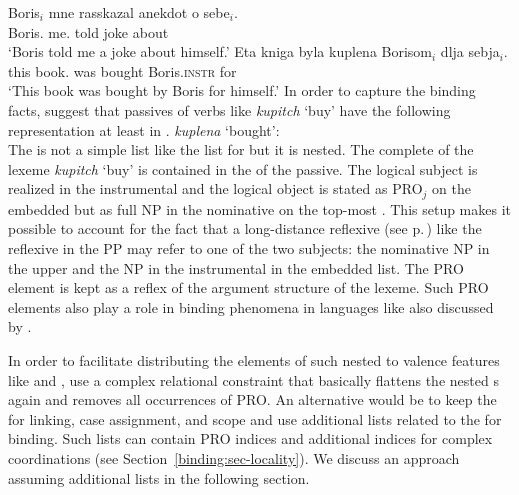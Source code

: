 \documentclass[output=paper
	        ,collection
	        ,collectionchapter
 	        ,biblatex
                ,babelshorthands
                ,newtxmath
                ,draftmode
                ,colorlinks, citecolor=brown
]{langscibook}
\begin{document}
\eal
\label{binding:russian-pass}
\ex  
\gll Boris$_i$    mne      rasskazal anekdot o sebe$_i$.\\
     Boris.\nom{} me.\dat{} told      joke    about \self\\
\glt `Boris told me a joke about himself.'
\ex
\gll Eta kniga byla kuplena Borisom$_{i}$ dlja sebja$_{i}$.  \\
     this book.\nom{} was bought Boris.\textsc{instr} for \self  \\
\glt `This book was bought by Boris for himself.'
\zl
In order to capture the binding facts, \citet{MS98a} suggest that passives of verbs like
\emph{kupitch} `buy' have the following representation at least in .
\ea
\emph{kuplena} `bought':\\
\z
The \argstl is not a simple list like the list for  but it is nested. The complete \argstl of
the lexeme \emph{kupitch} `buy' is contained in the \argstl of the passive. The logical subject is
realized in the instrumental and the logical object is stated as PRO$_j$ on the embedded \argst but
as full NP in the nominative on the top-most \argstl. This setup makes it possible to account for
the fact that a long-distance reflexive (see p.\,\pageref{page-long-distance-reflexives}) like the
reflexive in the PP may refer to one of the two subjects: the nominative NP in the upper \argstl and
the NP in the instrumental in the embedded list. The PRO element is kept as a reflex of the
argument structure of the lexeme. Such PRO elements also play a role in binding phenomena in languages
like  also discussed by \citeauthor{MS98a}.

In order to facilitate distributing the elements of such nested \argstls to valence features like
\subj and \comps, \citet[, 140]{MS98a} use a complex relational constraint that basically flattens the
nested \argst{}s again and removes all occurrences of PRO. An alternative would be to keep the
\argstl for linking, case assignment, and scope and use additional lists related to the \argstl for
binding. Such lists can contain PRO indices and additional indices for complex coordinations (see
Section~\ref{binding:sec-locality}). We discuss an approach assuming additional lists in the
following section.
\end{document}
